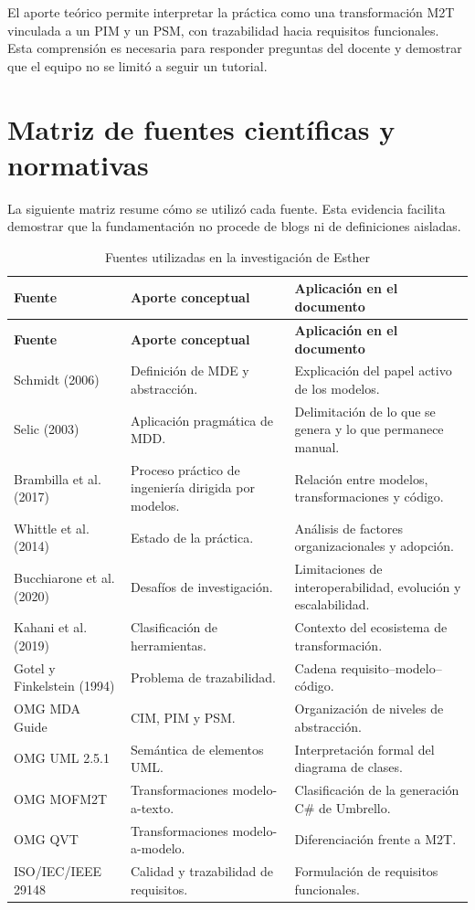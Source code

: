 El aporte teórico permite interpretar la práctica como una transformación M2T vinculada a un PIM y un PSM, con trazabilidad hacia requisitos funcionales. Esta comprensión es necesaria para responder preguntas del docente y demostrar que el equipo no se limitó a seguir un tutorial.


\appendices
\section{Matriz de fuentes científicas y normativas}
La siguiente matriz resume cómo se utilizó cada fuente. Esta evidencia facilita demostrar que la fundamentación no procede de blogs ni de definiciones aisladas.

\begin{longtable}{L{3.8cm}L{4.2cm}L{6.1cm}}
\caption{Fuentes utilizadas en la investigación de Esther}\\
\toprule
\textbf{Fuente} & \textbf{Aporte conceptual} & \textbf{Aplicación en el documento} \\
\midrule
\endfirsthead
\toprule
\textbf{Fuente} & \textbf{Aporte conceptual} & \textbf{Aplicación en el documento} \\
\midrule
\endhead
Schmidt (2006) & Definición de MDE y abstracción. & Explicación del papel activo de los modelos. \\
Selic (2003) & Aplicación pragmática de MDD. & Delimitación de lo que se genera y lo que permanece manual. \\
Brambilla et al. (2017) & Proceso práctico de ingeniería dirigida por modelos. & Relación entre modelos, transformaciones y código. \\
Whittle et al. (2014) & Estado de la práctica. & Análisis de factores organizacionales y adopción. \\
Bucchiarone et al. (2020) & Desafíos de investigación. & Limitaciones de interoperabilidad, evolución y escalabilidad. \\
Kahani et al. (2019) & Clasificación de herramientas. & Contexto del ecosistema de transformación. \\
Gotel y Finkelstein (1994) & Problema de trazabilidad. & Cadena requisito--modelo--código. \\
OMG MDA Guide & CIM, PIM y PSM. & Organización de niveles de abstracción. \\
OMG UML 2.5.1 & Semántica de elementos UML. & Interpretación formal del diagrama de clases. \\
OMG MOFM2T & Transformaciones modelo-a-texto. & Clasificación de la generación C\# de Umbrello. \\
OMG QVT & Transformaciones modelo-a-modelo. & Diferenciación frente a M2T. \\
ISO/IEC/IEEE 29148 & Calidad y trazabilidad de requisitos. & Formulación de requisitos funcionales. \\
\bottomrule
\end{longtable}

